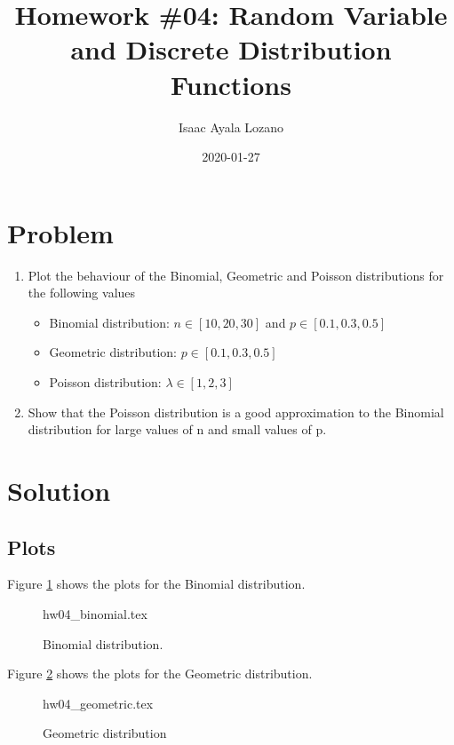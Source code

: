 \documentclass[a4paper,12pt]{article}
\title{Homework \#04: Random Variable and Discrete Distribution Functions}
\author{Isaac Ayala Lozano}
\date{2020-01-27}
\begin{document}
\maketitle

\section{Problem}
\begin{enumerate}
 \item Plot the behaviour of the Binomial, Geometric and Poisson distributions for the following values
    \begin{itemize}
     \item Binomial distribution: $n \in [10, 20, 30]$ and $p \in [0.1, 0.3, 0.5]$
     \item Geometric distribution: $p \in [0.1, 0.3, 0.5]$
     \item Poisson distribution: $\lambda \in [1, 2, 3]$
    \end{itemize}
\item Show that the Poisson distribution is a good approximation to the Binomial distribution for large values of n and small values of p.
\end{enumerate}

\section{Solution}

\subsection{Plots}
Figure \ref{fig: binomial plots} shows the plots for the Binomial distribution.\\

\begin{figure}[htb!]
\centering
{hw04_binomial.tex}
\caption{Binomial distribution.}
\label{fig: binomial plots}
\end{figure}

\pagebreak

Figure \ref{fig: geometric plots} shows the plots for the Geometric distribution.\\

\begin{figure}
\centering
{hw04_geometric.tex}
\caption{Geometric distribution}
\label{fig: geometric plots}
\end{figure}
\end{document}
